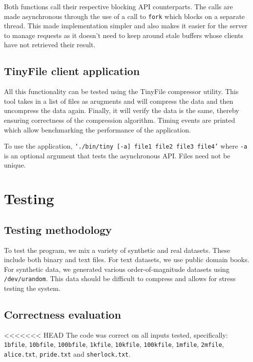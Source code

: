 \documentclass[paper=a4,fontsize=11pt]{report} %
\numberwithin{equation}{section} %
\numberwithin{figure}{section} %
\numberwithin{table}{section} %
\begin{document}
Both functions call their respective blocking API counterparts. The calls are made asynchronous through the use of a call to \texttt{fork} which blocks on a separate thread. This made implementation simpler and also makes it easier for the server to manage requests as it doesn't need to keep around stale buffers whose clients have not retrieved their result.


\subsection{TinyFile client application}

All this functionality can be tested using the TinyFile compressor utility. This tool takes in a list of files as arugments and will compress the data and then uncompress the data again. Finally, it will verify the data is the same, thereby ensuring correctness of the compression algorithm. Timing events are printed which allow benchmarking the performance of the application.

To use the application, \texttt{`./bin/tiny [-a] file1 file2 file3 file4'} where \texttt{-a} is an optional argument that tests the asynchronous API. Files need not be unique.

\section{Testing}

\subsection{Testing methodology}
To test the program, we mix a variety of synthetic and real datasets. These include both binary and text files. For text datasets, we use public domain books. For synthetic data, we generated various order-of-magnitude datasets using \texttt{/dev/urandom}. This data should be difficult to compress and allows for stress testing the system.

\subsection{Correctness evaluation}

<<<<<<< HEAD
The code was correct on all inputs tested, specifically: \texttt{1bfile}, \texttt{10bfile}, \texttt{100bfile}, \texttt{1kfile}, \texttt{10kfile}, \texttt{100kfile}, \texttt{1mfile}, \texttt{2mfile}, \texttt{alice.txt}, \texttt{pride.txt} and \texttt{sherlock.txt}.
\end{document}
